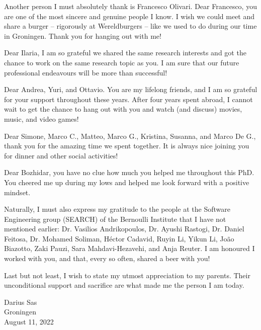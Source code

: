 Another person I must absolutely thank is Francesco Olivari. Dear Francesco, you are one of the most sincere and genuine people I know.  
I wish we could meet and share a burger -- rigorously at Wereldburgers -- like we used to do during our time in Groningen.
Thank you for hanging out with me! 

Dear Ilaria, I am so grateful we shared the same research interests and got the chance to work on the same research topic as you. I am sure that our future professional endeavours will be more than successful!

Dear Andrea, Yuri, and Ottavio. You are my lifelong friends, and I am so grateful for your support throughout these years. 
After four years spent abroad, I cannot wait to get the chance to hang out with you and watch (and discuss) movies, music, and video games!

Dear Simone, Marco C., Matteo, Marco G., Kristina, Susanna, and Marco De G., thank you for the amazing time we spent together. It is always nice joining you for dinner and other social activities!

Dear Bozhidar, you have no clue how much you helped me throughout this PhD. You cheered me up during my lows and helped me look forward with a positive mindset.

Naturally, I must also express my gratitude to the people at the Software Engineering group (SEARCH) of the Bernoulli Institute that I have not mentioned earlier: Dr. Vasilios Andrikopoulos,  Dr. Ayushi Rastogi, Dr. Daniel Feitosa,  Dr. Mohamed Soliman, H\'ector Cadavid, Ruyin Li, Yikun Li, João Biazotto, Zaki Pauzi, Sara Mahdavi-Hezavehi, and Anja Reuter. 
I am honoured I worked with you, and that, every so often, shared a beer with you!

Last but not least, I wish to state my utmost appreciation to my parents.
Their unconditional support and sacrifice are what made me the person I am today.


\begin{flushright}
    Darius Sas\\
    Groningen\\
    August 11, 2022
\end{flushright}
